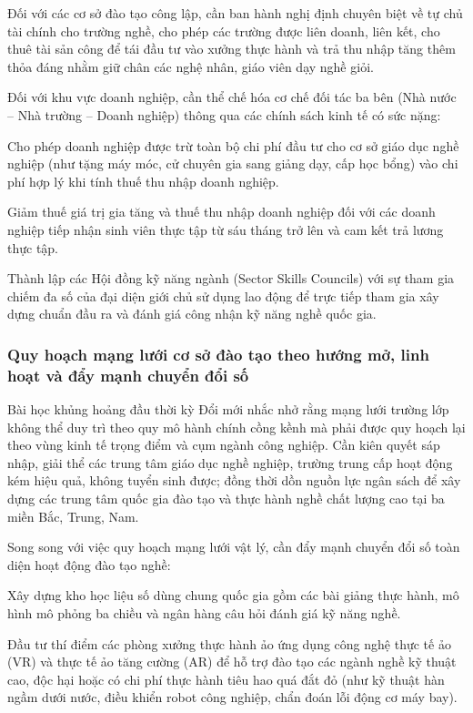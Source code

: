 Đối với các cơ sở đào tạo công lập, cần ban hành nghị định chuyên biệt về tự chủ tài chính cho trường nghề, cho phép các trường được liên doanh, liên kết, cho thuê tài sản công để tái đầu tư vào xưởng thực hành và trả thu nhập tăng thêm thỏa đáng nhằm giữ chân các nghệ nhân, giáo viên dạy nghề giỏi.

Đối với khu vực doanh nghiệp, cần thể chế hóa cơ chế đối tác ba bên (Nhà nước -- Nhà trường -- Doanh nghiệp) thông qua các chính sách kinh tế có sức nặng:

Cho phép doanh nghiệp được trừ toàn bộ chi phí đầu tư cho cơ sở giáo dục nghề nghiệp (như tặng máy móc, cử chuyên gia sang giảng dạy, cấp học bổng) vào chi phí hợp lý khi tính thuế thu nhập doanh nghiệp.

Giảm thuế giá trị gia tăng và thuế thu nhập doanh nghiệp đối với các doanh nghiệp tiếp nhận sinh viên thực tập từ sáu tháng trở lên và cam kết trả lương thực tập.

Thành lập các Hội đồng kỹ năng ngành (Sector Skills Councils) với sự tham gia chiếm đa số của đại diện giới chủ sử dụng lao động để trực tiếp tham gia xây dựng chuẩn đầu ra và đánh giá công nhận kỹ năng nghề quốc gia.

\subsubsection{Quy hoạch mạng lưới cơ sở đào tạo theo hướng mở, linh hoạt và đẩy mạnh chuyển đổi số}

Bài học khủng hoảng đầu thời kỳ Đổi mới nhắc nhở rằng mạng lưới trường lớp không thể duy trì theo quy mô hành chính cồng kềnh mà phải được quy hoạch lại theo vùng kinh tế trọng điểm và cụm ngành công nghiệp. Cần kiên quyết sáp nhập, giải thể các trung tâm giáo dục nghề nghiệp, trường trung cấp hoạt động kém hiệu quả, không tuyển sinh được; đồng thời dồn nguồn lực ngân sách để xây dựng các trung tâm quốc gia đào tạo và thực hành nghề chất lượng cao tại ba miền Bắc, Trung, Nam.

Song song với việc quy hoạch mạng lưới vật lý, cần đẩy mạnh chuyển đổi số toàn diện hoạt động đào tạo nghề:

Xây dựng kho học liệu số dùng chung quốc gia gồm các bài giảng thực hành, mô hình mô phỏng ba chiều và ngân hàng câu hỏi đánh giá kỹ năng nghề.

Đầu tư thí điểm các phòng xưởng thực hành ảo ứng dụng công nghệ thực tế ảo (VR) và thực tế ảo tăng cường (AR) để hỗ trợ đào tạo các ngành nghề kỹ thuật cao, độc hại hoặc có chi phí thực hành tiêu hao quá đắt đỏ (như kỹ thuật hàn ngầm dưới nước, điều khiển robot công nghiệp, chẩn đoán lỗi động cơ máy bay).

